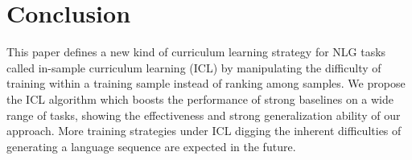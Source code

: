 \section{Conclusion}

This paper defines a new kind of curriculum learning strategy for NLG tasks called in-sample curriculum learning (ICL) by manipulating the difficulty of training within a training sample instead of ranking among samples. We propose the ICL algorithm which boosts the performance of strong baselines on a wide range of tasks, showing the effectiveness and strong generalization ability of our approach. More training strategies under ICL digging the inherent difficulties of generating a language sequence are expected in the future.


